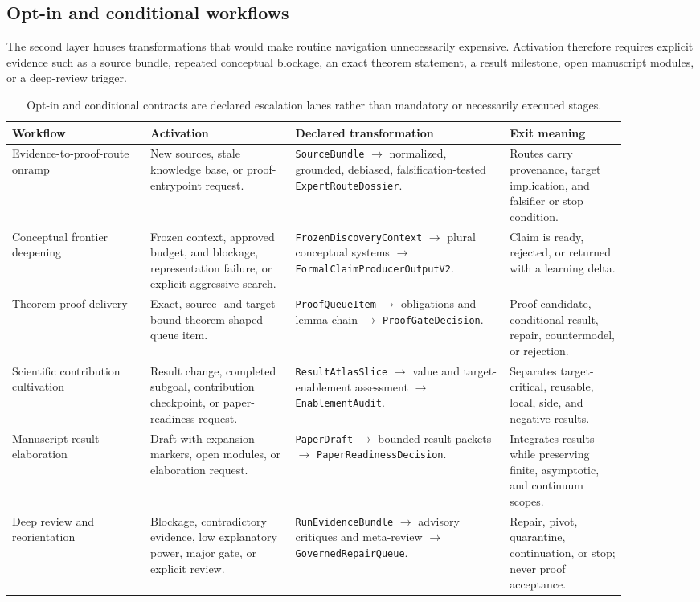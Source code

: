 \documentclass[11pt]{article}
\begin{document}
\subsection{Opt-in and conditional workflows}

The second layer houses transformations that would make routine navigation unnecessarily expensive. Activation therefore requires explicit evidence such as a source bundle, repeated conceptual blockage, an exact theorem statement, a result milestone, open manuscript modules, or a deep-review trigger.

\begin{table}[H]
\centering\scriptsize
\begin{tabular}{p{0.20\linewidth}p{0.21\linewidth}p{0.31\linewidth}p{0.17\linewidth}}
\toprule
Workflow & Activation & Declared transformation & Exit meaning \\
\midrule
Evidence-to-proof-route onramp & New sources, stale knowledge base, or proof-entrypoint request. & \texttt{SourceBundle} $\rightarrow$ normalized, grounded, debiased, falsification-tested \texttt{ExpertRouteDossier}. & Routes carry provenance, target implication, and falsifier or stop condition. \\
Conceptual frontier deepening & Frozen context, approved budget, and blockage, representation failure, or explicit aggressive search. & \texttt{FrozenDiscoveryContext} $\rightarrow$ plural conceptual systems $\rightarrow$ \texttt{FormalClaimProducerOutputV2}. & Claim is ready, rejected, or returned with a learning delta. \\
Theorem proof delivery & Exact, source- and target-bound theorem-shaped queue item. & \texttt{ProofQueueItem} $\rightarrow$ obligations and lemma chain $\rightarrow$ \texttt{ProofGateDecision}. & Proof candidate, conditional result, repair, countermodel, or rejection. \\
Scientific contribution cultivation & Result change, completed subgoal, contribution checkpoint, or paper-readiness request. & \texttt{ResultAtlasSlice} $\rightarrow$ value and target-enablement assessment $\rightarrow$ \texttt{EnablementAudit}. & Separates target-critical, reusable, local, side, and negative results. \\
Manuscript result elaboration & Draft with expansion markers, open modules, or elaboration request. & \texttt{PaperDraft} $\rightarrow$ bounded result packets $\rightarrow$ \texttt{PaperReadinessDecision}. & Integrates results while preserving finite, asymptotic, and continuum scopes. \\
Deep review and reorientation & Blockage, contradictory evidence, low explanatory power, major gate, or explicit review. & \texttt{RunEvidenceBundle} $\rightarrow$ advisory critiques and meta-review $\rightarrow$ \texttt{GovernedRepairQueue}. & Repair, pivot, quarantine, continuation, or stop; never proof acceptance. \\
\bottomrule
\end{tabular}
\caption{Opt-in and conditional contracts are declared escalation lanes rather than mandatory or necessarily executed stages.}
\label{tab:escalation-workflows}
\end{table}
\end{document}
